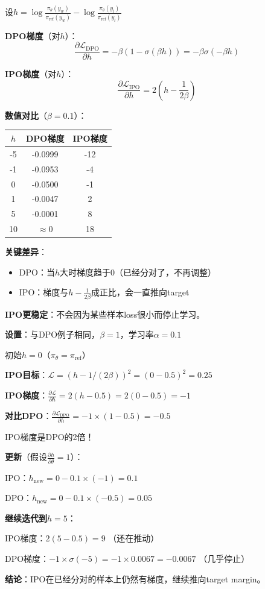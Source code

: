 \documentclass[11pt,a4paper]{article}
\theoremstyle{definition}
\begin{document}
\begin{calculation}
设$h = \log \frac{\pi_\theta(y_w)}{\pi_{\text{ref}}(y_w)} - \log \frac{\pi_\theta(y_l)}{\pi_{\text{ref}}(y_l)}$

\textbf{DPO梯度}（对$h$）：
\[
\frac{\partial \mathcal{L}_{\text{DPO}}}{\partial h} = -\beta(1 - \sigma(\beta h)) = -\beta \sigma(-\beta h)
\]

\textbf{IPO梯度}（对$h$）：
\[
\frac{\partial \mathcal{L}_{\text{IPO}}}{\partial h} = 2\left(h - \frac{1}{2\beta}\right)
\]

\textbf{数值对比}（$\beta = 0.1$）：

\begin{center}
\begin{tabular}{c|c|c}
\toprule
$h$ & DPO梯度 & IPO梯度 \\
\midrule
-5 & -0.0999 & -12 \\
-1 & -0.0953 & -4 \\
0 & -0.0500 & -1 \\
1 & -0.0047 & 2 \\
5 & -0.0001 & 8 \\
10 & $\approx 0$ & 18 \\
\bottomrule
\end{tabular}
\end{center}

\textbf{关键差异}：
\begin{itemize}
    \item DPO：当$h$大时梯度趋于0（已经分对了，不再调整）
    \item IPO：梯度与$h - \frac{1}{2\beta}$成正比，会一直推向target
\end{itemize}

\textbf{IPO更稳定}：不会因为某些样本loss很小而停止学习。
\end{calculation}

\begin{calculation}
\textbf{设置}：与DPO例子相同，$\beta = 1$，学习率$\alpha = 0.1$

初始$h = 0$（$\pi_\theta = \pi_{\text{ref}}$）

\textbf{IPO目标}：$\mathcal{L} = (h - 1/(2\beta))^2 = (0 - 0.5)^2 = 0.25$

\textbf{IPO梯度}：$\frac{\partial \mathcal{L}}{\partial h} = 2(h - 0.5) = 2(0 - 0.5) = -1$

\textbf{对比DPO}：$\frac{\partial \mathcal{L}_{\text{DPO}}}{\partial h} = -1 \times (1 - 0.5) = -0.5$

IPO梯度是DPO的2倍！

\textbf{更新}（假设$\frac{\partial h}{\partial \theta} = 1$）：

IPO：$h_{\text{new}} = 0 - 0.1 \times (-1) = 0.1$

DPO：$h_{\text{new}} = 0 - 0.1 \times (-0.5) = 0.05$

\textbf{继续迭代到$h = 5$}：

IPO梯度：$2(5 - 0.5) = 9$ （还在推动）

DPO梯度：$-1 \times \sigma(-5) = -1 \times 0.0067 = -0.0067$ （几乎停止）

\textbf{结论}：IPO在已经分对的样本上仍然有梯度，继续推向target margin。
\end{calculation}
\end{document}
